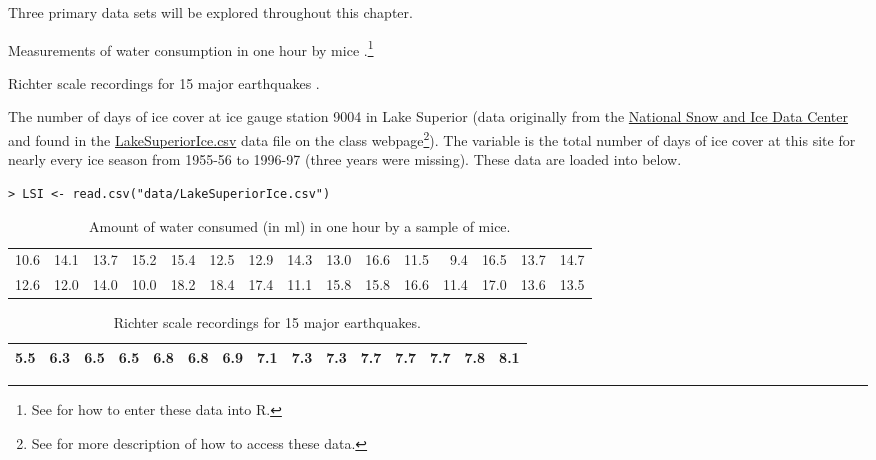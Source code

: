\documentclass[10pt,openany]{book}\usepackage[]{graphicx}\usepackage[]{color}
\makeatletter
\newenvironment{kframe}{%
 \def\at@end@of@kframe{}%
 \ifinner\ifhmode%
  \def\at@end@of@kframe{\end{minipage}}%
  \begin{minipage}{\columnwidth}%
 \fi\fi%
 \def\FrameCommand##1{\hskip\@totalleftmargin \hskip-\fboxsep
 \colorbox{shadecolor}{##1}\hskip-\fboxsep
     \hskip-\linewidth \hskip-\@totalleftmargin \hskip\columnwidth}%
 \MakeFramed {\advance\hsize-\width
   \@totalleftmargin\z@ \linewidth\hsize
   \@setminipage}}%
 {\par\unskip\endMakeFramed%
 \at@end@of@kframe}
\newenvironment{knitrout}{}{} %
\makeatother
\begin{document}
Three primary data sets will be explored throughout this chapter.

\vspace{-12pt}
\begin{Itemize}
  \item Measurements of water consumption in one hour by mice .\footnote{See  for how to enter these data into R.}
  \item Richter scale recordings for 15 major earthquakes .
  \item The number of days of ice cover at ice gauge station 9004 in Lake Superior (data originally from the \href{http://www.nsidc.org/}{National Snow and Ice Data Center} and found in the \href{https://raw.githubusercontent.com/droglenc/NCData/master/LakeSuperiorIce.csv}{LakeSuperiorIce.csv} data file on the class webpage\footnote{See  for more description of how to access these data.}).  The  variable is the total number of days of ice cover at this site for nearly every ice season from 1955-56 to 1996-97 (three years were missing).  These data are loaded into  below.
\vspace{-6pt}
\begin{knitrout}
\color{fgcolor}\begin{kframe}
\begin{verbatim}
> LSI <- read.csv("data/LakeSuperiorIce.csv")
\end{verbatim}
\end{kframe}
\end{knitrout}
\end{Itemize}

\begin{table}[ht]
\centering
\caption{Amount of water consumed (in ml) in one hour by a sample of mice.} 
\label{tab:MouseData}
\begin{tabular}{rrrrrrrrrrrrrrr}
   \hline
10.6 & 14.1 & 13.7 & 15.2 & 15.4 & 12.5 & 12.9 & 14.3 & 13.0 & 16.6 & 11.5 & 9.4 & 16.5 & 13.7 & 14.7 \\ 
  12.6 & 12.0 & 14.0 & 10.0 & 18.2 & 18.4 & 17.4 & 11.1 & 15.8 & 15.8 & 16.6 & 11.4 & 17.0 & 13.6 & 13.5 \\ 
   \hline
\end{tabular}
\end{table}


\begin{table}[ht]
\centering
\caption{Richter scale recordings for 15 major earthquakes.} 
\label{tab:EQData}
\begin{tabular}{rrrrrrrrrrrrrrr}
   \hline
5.5 & 6.3 & 6.5 & 6.5 & 6.8 & 6.8 & 6.9 & 7.1 & 7.3 & 7.3 & 7.7 & 7.7 & 7.7 & 7.8 & 8.1 \\ 
   \hline
\end{tabular}
\end{table}
\end{document}
